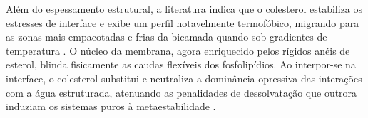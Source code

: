 \documentclass[12pt]{article} %
\begin{document}
Além do espessamento estrutural, a literatura indica que o colesterol estabiliza os estresses de interface e exibe um perfil notavelmente termofóbico, migrando para as zonas mais empacotadas e frias da bicamada quando sob gradientes de temperatura \cite{deng2026}. O núcleo da membrana, agora enriquecido pelos rígidos anéis de esterol, blinda fisicamente as caudas flexíveis dos fosfolipídios. Ao interpor-se na interface, o colesterol substitui e neutraliza a dominância opressiva das interações com a água estruturada, atenuando as penalidades de dessolvatação que outrora induziam os sistemas puros à metaestabilidade \cite{borges2023, deng2026}.


 


\newpage %

\end{document}
